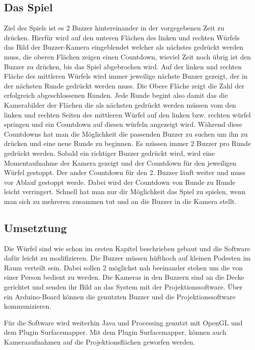 \documentclass[pdftex,12pt,a4paper]{report}
\begin{document}
\subsection{Das Spiel}
Ziel des Spiels ist es 2 Buzzer hintereinander in der vorgegebenen Zeit zu drücken. Hierfür wird auf den unteren Flächen des linken und rechten Würfels das Bild der Buzzer-Kamera eingeblendet welcher als nächstes gedrückt werden muss, die oberen Flächen zeigen einen Countdown, wieviel Zeit noch übrig ist den Buzzer zu drücken, bis das Spiel abgebrochen wird.  Auf der linken und rechten Fläche des mittleren Würfels wird immer jeweilige nächste Buzzer gezeigt, der in der nächsten Runde gedrückt werden muss. Die Obere Fläche zeigt die Zahl der erfolgreich abgeschlossenen Runden. 
Jede Runde begint also damit das die Kamerabilder der Flächen die als nächsten gedrückt werden müssen vom den linken und rechten Seiten des mittleren Würfel auf den linken bzw. rechten würfel springen und ein Countdown auf diesen würfeln angezeigt wird. Während diese Countdowns hat man die Möglichkeit die passenden Buzzer zu suchen um ihn zu drücken und eine neue Runde zu beginnen. Es müssen immer 2 Buzzer pro Runde gedrückt werden. Sobald ein richtiger Buzzer gedrückt wird, wird eine Momentaufnahme der Kamera gezeigt und der Countdown für den jeweiligen Würfel gestoppt. Der ander Countdown für den 2. Buzzer läuft weiter und muss vor Ablauf gestoppt werde. Dabei wird der Countdown von Runde zu Runde leicht verringert. Schnell hat man nur dir Möglichkeit das Spiel zu spielen, wenn man sich zu mehreren zusammen tut und an die Buzzer in die Kamera stellt.

\subsection{Umsetztung}
Die Würfel sind wie schon im ersten Kapitel beschrieben gebaut und die Software dafür leicht zu modifizieren. Die Buzzer müssen hüfthoch auf kleinen Podesten im Raum verteilt sein. Dabei sollen 2 möglichst nah beeinander stehen um die von einer Person bedient zu werden. Die Kameras in den Buzzern sind an die Decke gerichtet und senden ihr Bild an das System mit der Projektionssoftware. Über ein Arduino-Board können die genutzten Buzzer und die Projektionssoftware kommunizieren.

Für die Software wird weiterhin Java und Processing genutzt mit OpenGL und dem Plugin Surfacemapper.
Mit dem Plugin Surfacemapper, können auch Kameraaufnahmen auf die Projektionsflächen geworfen werden.
\end{document}
